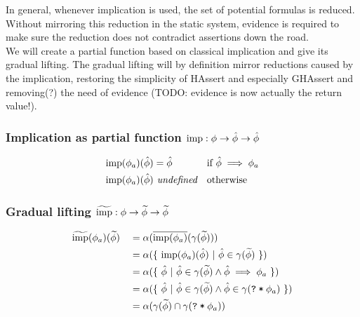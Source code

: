 \documentclass[11pt,a4paper]{article}
\begin{document}
In general, whenever implication is used, the set of potential formulas is reduced. Without mirroring this reduction in the static system, evidence is required to make sure the reduction does not contradict assertions down the road.\\

We will create a partial function based on classical implication and give its gradual lifting.
The gradual lifting will by definition mirror reductions caused by the implication, restoring the simplicity of HAssert and especially GHAssert and removing(?) the need of evidence (TODO: evidence is now actually the return value!).\\


\subsubsection{Implication as partial function $\text{imp} : \phi \rightarrow \hat{\phi} \rightarrow \hat{\phi}$}
\begin{align*}
&\text{imp}(\phi_a)(\hat{\phi}) = \hat{\phi}                   &&\text{if $\hat{\phi} \implies \phi_a$}\\
&\text{imp}(\phi_a)(\hat{\phi}) \textit{~undefined}      &&\text{otherwise}\\
\end{align*}

\subsubsection{Gradual lifting $\widetilde{\text{imp}} : \phi \rightarrow \widetilde{\phi} \rightarrow \widetilde{\phi}$}
\begin{align*}
&\widetilde{\text{imp}}(\phi_a)(\widetilde{\phi}) 
  &&= \alpha(\overline{\text{imp}(\phi_a)}(\gamma(\widetilde{\phi})))\\
& &&= \alpha(\{~ \text{imp}(\phi_a)(\hat{\phi}) ~|~ \hat{\phi} \in \gamma(\widetilde{\phi}) ~\})\\
& &&= \alpha(\{~ \hat{\phi} ~|~ \hat{\phi} \in \gamma(\widetilde{\phi}) \wedge \hat{\phi} \implies \phi_a ~\})\\
& &&= \alpha(\{~ \hat{\phi} ~|~ \hat{\phi} \in \gamma(\widetilde{\phi}) \wedge \hat{\phi} \in \gamma(\texttt{\texttt{?}\:*\:$\phi_a$}) ~\})\\
& &&= \alpha(\gamma(\widetilde{\phi}) \cap \gamma(\texttt{\texttt{?}\:*\:$\phi_a$}))\\
\end{align*}
\end{document}
